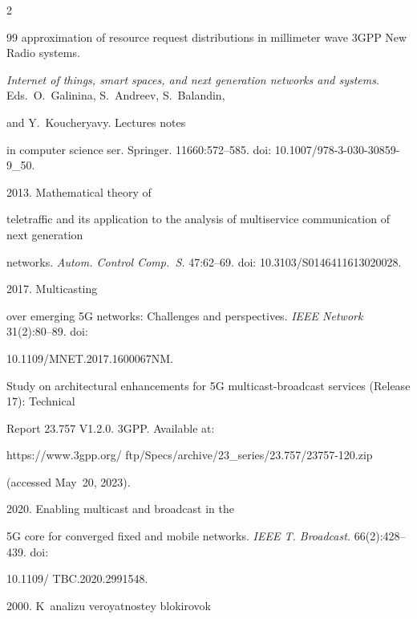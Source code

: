 \begin{multicols}{2}
{{\begin{thebibliography}{99}
approximation of resource request distributions in millimeter wave 3GPP New Radio systems. 

\textit{Internet of things, smart spaces, and next generation networks and systems}. Eds.\ O.~Galinina, S.~Andreev, S.~Balandin,

and Y.~Koucheryavy. Lectures notes 

in computer science ser. Springer. 11660:572--585. doi: 10.1007/978-3-030-30859-9\_50.


   2013. Mathematical theory of 

teletraffic and its application to the analysis of multiservice communication of next generation 

networks. \textit{Autom. Control Comp.~S.}  47:62--69. doi:  10.3103/S0146411613020028.

  


   2017. Multicasting 

over emerging 5G networks: Challenges and perspectives. \textit{IEEE Network} 31(2):80--89. doi: 

10.1109/MNET.2017.1600067NM.




  Study on architectural enhancements for 5G multicast-broadcast services (Release 17): Technical 

Report 23.757 V1.2.0. 3GPP. Available at:  {\sf 

https://www.3gpp.org/ ftp/Specs/archive/23\_series/23.757/23757-120.zip} (accessed May~20, 2023).


   2020. Enabling multicast and broadcast in the 

5G core for converged fixed and mobile networks. \textit{IEEE T. Broadcast.} 66(2):428--439. doi: 

10.1109/ TBC.2020.2991548.


   2000. K~analizu ve\-ro\-yat\-no\-stey blokirovok 


\end{thebibliography}}}
\end{multicols}
